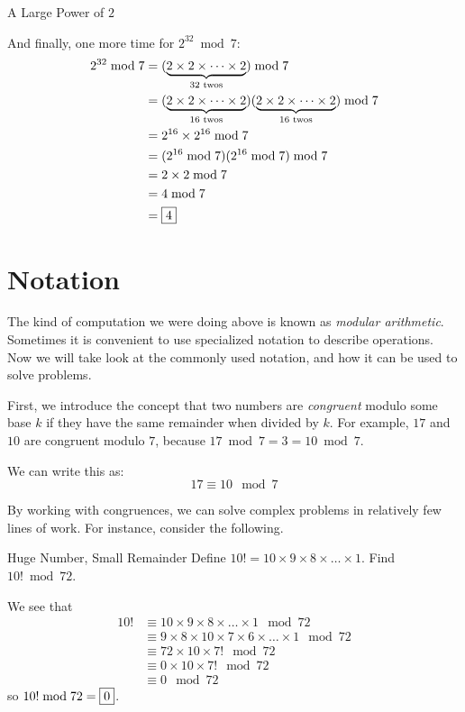 \documentclass[a4paper,10pt]{report}
\begin{document}
\begin{problem}{A Large Power of $2$}
\begin{solution}
  And finally, one more time for $2^{32} \bmod 7$: \begin{align*}
   2^{32} \bmod 7
   &= (\underbrace{2 \times 2 \times \dots \times 2}_{32\text{ twos}}) \bmod 7 \\
   &= (\underbrace{2 \times 2 \times \dots \times 2}_{16\text{ twos}})
   (\underbrace{2 \times 2 \times \dots \times 2}_{16\text{ twos}}) \bmod 7 \\
   &= 2^{16}\times2^{16} \bmod 7 \\
   &= (2^{16} \bmod 7)(2^{16} \bmod 7) \bmod 7 \\
   &= 2 \times 2 \bmod 7 \\
   &= 4 \bmod 7 \\
   &= \Ans{4}
  \end{align*}

 \end{solution}
\end{problem}

\section{Notation}

The kind of computation we were doing above is known as \emph{modular
arithmetic}. Sometimes it is convenient to use specialized notation to describe
operations. Now we will take look at the commonly used notation, and how it can
be used to solve problems.

First, we introduce the concept that two numbers are \emph{congruent} modulo
some base $k$ if they have the same remainder when divided by $k$. For example,
$17$ and $10$ are congruent modulo $7$, because $17 \bmod 7 = 3 = 10 \bmod 7$.

We can write this as: \[
 17 \equiv 10 \mod 7
\]

By working with congruences, we can solve complex problems in relatively few
lines of work. For instance, consider the following.

\begin{problem}{Huge Number, Small Remainder}
 Define $10! = 10 \times 9 \times 8 \times \dots \times 1$. Find $10! \bmod 72$.

 \begin{solution}
  We see that \begin{align*}
   10!
   &\equiv 10 \times 9 \times 8 \times \dots \times 1 \mod 72 \\
   &\equiv 9 \times 8 \times 10 \times 7 \times 6 \times \dots \times 1
   \mod 72 \\
   &\equiv 72 \times 10 \times 7! \mod 72 \\
   &\equiv 0 \times 10 \times 7! \mod 72 \\
   &\equiv 0 \mod 72
  \end{align*}
  so $10! \bmod 72 = \Ans{0}$.
 \end{solution}
\end{problem}
\end{document}
